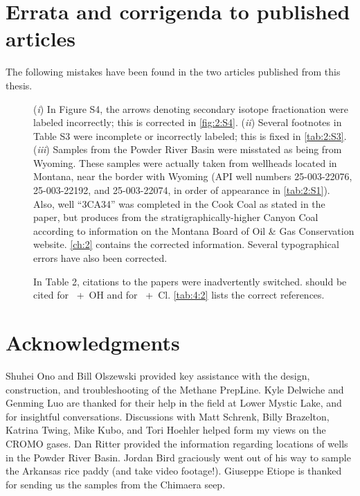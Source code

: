 \section{Errata and corrigenda to published articles} \label{errata}

The following mistakes have been found in the two articles published from this thesis.
\begin{description}
	\item[\textcite{Wang++_2015_S}]  (\emph{i}) In Figure S4, the arrows denoting secondary isotope fractionation were labeled incorrectly; this is corrected in \autoref{fig:2:S4}.  (\emph{ii}) Several footnotes in Table S3 were incomplete or incorrectly labeled; this is fixed in \autoref{tab:2:S3}.  (\emph{iii}) Samples from the Powder River Basin were misstated as being from Wyoming.  These samples were actually taken from wellheads located in Montana, near the border with Wyoming (API well numbers 25-003-22076, 25-003-22192, and 25-003-22074, in order of appearance in \autoref{tab:2:S1}).  Also, well ``3CA34'' was completed in the Cook Coal as stated in the paper, but produces from the stratigraphically-higher Canyon Coal according to information on the Montana Board of Oil \& Gas Conservation website. \autoref{ch:2} contains the corrected information.  Several typographical errors have also been corrected.
	\item[\textcite{Wang++_2016_GCA}]  In Table 2, citations to the \citeauthor{Joelsson++_2014_CPL} papers were inadvertently switched.  \textcite{Joelsson++_2015_ACPD,Joelsson++_2016_ACP} should be cited for ~+~OH and \textcite{Joelsson++_2014_CPL} for ~+~Cl\@.  \autoref{tab:4:2} lists the correct references.
\end{description}



\section{Acknowledgments}

Shuhei Ono and Bill Olszewski provided key assistance with the design, 
construction, and troubleshooting of the Methane PrepLine.  Kyle Delwiche and Genming Luo are thanked for their help in the field at Lower Mystic Lake, and for insightful conversations.  Discussions with Matt Schrenk, Billy Brazelton, Katrina Twing, Mike Kubo, and Tori Hoehler helped form my views on the CROMO gases.  Dan Ritter provided the information regarding locations of wells in the Powder River Basin.  Jordan Bird graciously went out of his way to sample the Arkansas rice paddy (and take video footage!).  Giuseppe Etiope is thanked for sending us the samples from the Chimaera seep.





